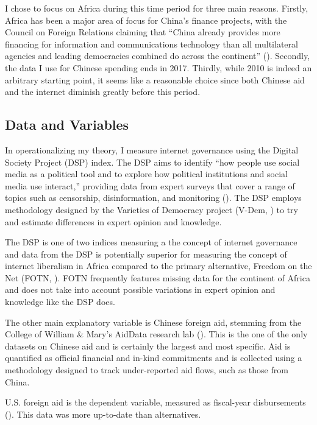\documentclass[12pt]{article}
\begin{document}
I chose to focus on Africa during this time period for three main reasons. Firstly, Africa has been a major area of focus for China's finance projects, with the Council on Foreign Relations claiming that ``China already provides more financing for information and communications technology than all multilateral agencies and leading democracies combined do across the continent'' (\cite{kurlantzicketal.2020}). Secondly, the data I use for Chinese spending ends in 2017. Thirdly, while 2010 is indeed an arbitrary starting point, it seems like a reasonable choice since both Chinese aid and the internet diminish greatly before this period.

\subsection*{Data and Variables}
In operationalizing my theory, I measure internet governance using the Digital Society Project (DSP) index. The DSP aims to identify ``how people use social media as a political tool and to explore how political institutions and social media use interact,'' providing data from expert surveys that cover a range of topics such as censorship, disinformation, and monitoring (\cite{mechkova2022}). The DSP employs methodology designed by the Varieties of Democracy project (V-Dem, \cite{coppedge2022}) to try and estimate differences in expert opinion and knowledge.

The DSP is one of two indices measuring a the concept of internet governance and data from the DSP is potentially superior for measuring the concept of internet liberalism in Africa compared to the primary alternative, Freedom on the Net (FOTN, \cite{freedomhouse2022}). FOTN frequently features missing data for the continent of Africa and does not take into account possible variations in expert opinion and knowledge like the DSP does.

The other main explanatory variable is Chinese foreign aid, stemming from the College of William \& Mary's AidData research lab (\cite{custer2021}). This is the one of the only datasets on Chinese aid and is certainly the largest and most specific. Aid is quantified as official financial and in-kind commitments and is collected using a methodology designed to track under-reported aid flows, such as those from China.

U.S. foreign aid is the dependent variable, measured as fiscal-year disbursements (\cite{u.s.agencyforinternationaldevelopment2022}). This data was more up-to-date than alternatives.
\end{document}
